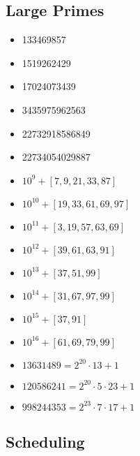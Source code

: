 \documentclass[8pt,a4paper,landscape,oneside]{amsart}
\newcommand{\codec}[1]{\inputminted[fontsize=\large,tabsize=2,baselinestretch=1]{cpp}{code/#1}}
\begin{document}
\begin{multicols*}{2}
\begin{large}
\subsection{Large Primes}
\begin{itemize}
    \item 133469857
    \item 1519262429
    \item 17024073439
    \item 3435975962563
    \item 22732918586849
    \item 22734054029887
    \item $10^{9} + [7,9,21,33,87]$
    \item $10^{10} + [19,33,61,69,97]$
    \item $10^{11} + [3,19,57,63,69]$
    \item $10^{12} + [39,61,63,91]$
    \item $10^{13} + [37,51,99]$
    \item $10^{14} + [31,67,97,99]$
    \item $10^{15} + [37,91]$
    \item $10^{16} + [61,69,79,99]$
    \item $13631489 = 2^{20}\cdot 13 + 1$
    \item $120586241 = 2^{20}\cdot 5\cdot 23 + 1$
    \item $998244353 = 2^{23}\cdot 7\cdot 17 + 1$
\end{itemize}
\subsection{Scheduling}
\codec{scheduling.cpp}
\renewcommand{\labelitemi}{\textendash}
\newpage

\end{large}
\end{multicols*}
\end{document}
